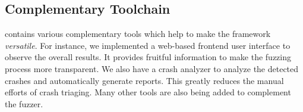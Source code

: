 \subsection{Complementary Toolchain}
{\FOT} contains various complementary tools which help to make the framework \textit{versatile}.
For instance, we implemented a web-based frontend user interface to observe the overall results.
It provides fruitful information to make the fuzzing process more transparent.
We also have a crash analyzer to analyze the detected crashes and automatically generate reports.
This greatly reduces the manual efforts of crash triaging.
Many other tools are also being added to complement the fuzzer.




